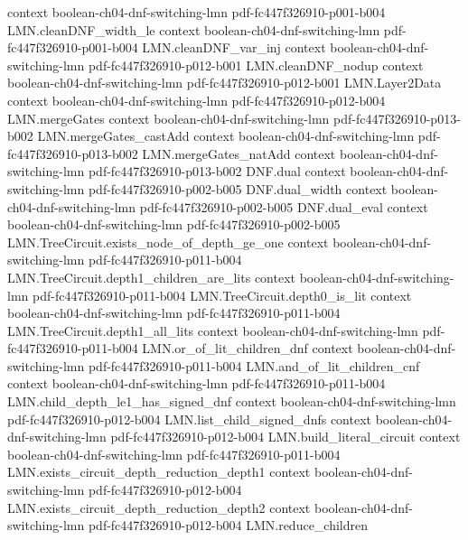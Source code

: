 \begin{lemma}
  {context}
  {boolean-ch04-dnf-switching-lmn}
  {pdf-fc447f326910-p001-b004}
\proofstep
  {LMN.cleanDNF_width_le}
  {context}
  {boolean-ch04-dnf-switching-lmn}
  {pdf-fc447f326910-p001-b004}
\proofstep
  {LMN.cleanDNF_var_inj}
  {context}
  {boolean-ch04-dnf-switching-lmn}
  {pdf-fc447f326910-p012-b001}
\proofstep
  {LMN.cleanDNF_nodup}
  {context}
  {boolean-ch04-dnf-switching-lmn}
  {pdf-fc447f326910-p012-b001}
\proofstep
  {LMN.Layer2Data}
  {context}
  {boolean-ch04-dnf-switching-lmn}
  {pdf-fc447f326910-p012-b004}
\proofstep
  {LMN.mergeGates}
  {context}
  {boolean-ch04-dnf-switching-lmn}
  {pdf-fc447f326910-p013-b002}
\proofstep
  {LMN.mergeGates_castAdd}
  {context}
  {boolean-ch04-dnf-switching-lmn}
  {pdf-fc447f326910-p013-b002}
\proofstep
  {LMN.mergeGates_natAdd}
  {context}
  {boolean-ch04-dnf-switching-lmn}
  {pdf-fc447f326910-p013-b002}
\proofstep
  {DNF.dual}
  {context}
  {boolean-ch04-dnf-switching-lmn}
  {pdf-fc447f326910-p002-b005}
\proofstep
  {DNF.dual_width}
  {context}
  {boolean-ch04-dnf-switching-lmn}
  {pdf-fc447f326910-p002-b005}
\proofstep
  {DNF.dual_eval}
  {context}
  {boolean-ch04-dnf-switching-lmn}
  {pdf-fc447f326910-p002-b005}
\proofstep
  {LMN.TreeCircuit.exists_node_of_depth_ge_one}
  {context}
  {boolean-ch04-dnf-switching-lmn}
  {pdf-fc447f326910-p011-b004}
\proofstep
  {LMN.TreeCircuit.depth1_children_are_lits}
  {context}
  {boolean-ch04-dnf-switching-lmn}
  {pdf-fc447f326910-p011-b004}
\proofstep
  {LMN.TreeCircuit.depth0_is_lit}
  {context}
  {boolean-ch04-dnf-switching-lmn}
  {pdf-fc447f326910-p011-b004}
\proofstep
  {LMN.TreeCircuit.depth1_all_lits}
  {context}
  {boolean-ch04-dnf-switching-lmn}
  {pdf-fc447f326910-p011-b004}
\proofstep
  {LMN.or_of_lit_children_dnf}
  {context}
  {boolean-ch04-dnf-switching-lmn}
  {pdf-fc447f326910-p011-b004}
\proofstep
  {LMN.and_of_lit_children_cnf}
  {context}
  {boolean-ch04-dnf-switching-lmn}
  {pdf-fc447f326910-p011-b004}
\proofstep
  {LMN.child_depth_le1_has_signed_dnf}
  {context}
  {boolean-ch04-dnf-switching-lmn}
  {pdf-fc447f326910-p012-b004}
\proofstep
  {LMN.list_child_signed_dnfs}
  {context}
  {boolean-ch04-dnf-switching-lmn}
  {pdf-fc447f326910-p012-b004}
\proofstep
  {LMN.build_literal_circuit}
  {context}
  {boolean-ch04-dnf-switching-lmn}
  {pdf-fc447f326910-p011-b004}
\proofstep
  {LMN.exists_circuit_depth_reduction_depth1}
  {context}
  {boolean-ch04-dnf-switching-lmn}
  {pdf-fc447f326910-p012-b004}
\proofstep
  {LMN.exists_circuit_depth_reduction_depth2}
  {context}
  {boolean-ch04-dnf-switching-lmn}
  {pdf-fc447f326910-p012-b004}
\proofstep
  {LMN.reduce_children}

\end{lemma}
